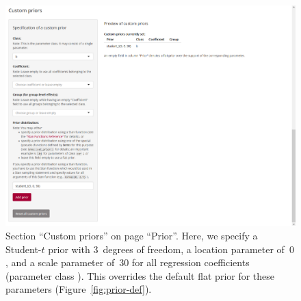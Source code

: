 \begin{figure}[t!]
  \centering
  \includegraphics[width=\textwidth]{Figures/Prior_Custom.png}
  \caption[Section ``Custom priors'']{Section ``Custom priors'' on page ``Prior''.
  Here, we specify a Student-$t$ prior with $3$~degrees of freedom, a location
  parameter of~$0$, and a scale parameter of~$30$ for all regression
  coefficients (parameter class ). This overrides the default flat prior
  for these parameters (Figure~\ref{fig:prior-def}).}
  \label{fig:prior-cust}
\end{figure}%

